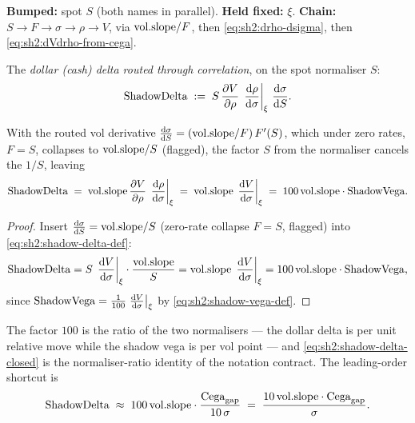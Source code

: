 \textbf{Bumped:} spot $S$ (both names in parallel). \textbf{Held fixed:}
$\xi$. \textbf{Chain:}
$S \to F \to \sigma \to \rho \to V$, via $\mathrm{vol.slope}/F$, then
\eqref{eq:sh2:drho-dsigma}, then \eqref{eq:sh2:dVdrho-from-cega}.

\begin{definition}\label{def:sh2:shadow-delta}
The \emph{dollar (cash) delta routed through correlation}, on the spot
normaliser $S$:
\begin{equation}\label{eq:sh2:shadow-delta-def}
  \mathrm{ShadowDelta}
  \;:=\; S\, \frac{\partial V}{\partial \rho}\,
         \left.\frac{\mathrm{d} \rho}{\mathrm{d} \sigma}\right|_{\xi}\, \frac{\mathrm{d} \sigma}{\mathrm{d} S}.
\end{equation}
\end{definition}

\begin{proposition}
\label{prop:sh2:shadow-delta}
With the routed vol derivative
$\frac{\mathrm{d} \sigma}{\mathrm{d} S} = (\mathrm{vol.slope} / F)\, F'(S)$, which under zero rates,
$F = S$, collapses to $\mathrm{vol.slope} / S$ (flagged), the factor $S$ from the
normaliser cancels the $1/S$, leaving
\begin{equation}\label{eq:sh2:shadow-delta-closed}
  \mathrm{ShadowDelta}
  \;=\; \mathrm{vol.slope}\, \frac{\partial V}{\partial \rho}\, \left.\frac{\mathrm{d} \rho}{\mathrm{d} \sigma}\right|_{\xi}
  \;=\; \mathrm{vol.slope}\, \left.\frac{\mathrm{d} V}{\mathrm{d} \sigma}\right|_{\xi}
  \;=\; 100\, \mathrm{vol.slope} \cdot \mathrm{ShadowVega} .
\end{equation}
\end{proposition}

\begin{proof}
Insert $\frac{\mathrm{d} \sigma}{\mathrm{d} S} = \mathrm{vol.slope} / S$ (zero-rate collapse $F = S$,
flagged) into \eqref{eq:sh2:shadow-delta-def}:
\[
  \mathrm{ShadowDelta}
  = S\, \left.\frac{\mathrm{d} V}{\mathrm{d} \sigma}\right|_{\xi} \cdot \frac{\mathrm{vol.slope}}{S}
  = \mathrm{vol.slope}\, \left.\frac{\mathrm{d} V}{\mathrm{d} \sigma}\right|_{\xi}
  = 100\, \mathrm{vol.slope} \cdot \mathrm{ShadowVega},
\]
since $\mathrm{ShadowVega} = \tfrac1{100} \left.\frac{\mathrm{d} V}{\mathrm{d} \sigma}\right|_{\xi}$ by
\eqref{eq:sh2:shadow-vega-def}.
\end{proof}

The factor $100$ is the ratio of the two normalisers --- the dollar delta
is per unit relative move while the shadow vega is per vol point --- and
\eqref{eq:sh2:shadow-delta-closed} is the normaliser-ratio identity of the
notation contract. The leading-order shortcut is
\begin{equation}\label{eq:sh2:shadow-delta-shortcut}
  \mathrm{ShadowDelta} \;\approx\; 100\, \mathrm{vol.slope} \cdot \frac{\mathrm{Cega}_{\mathrm{gap}}}{10\,\sigma}
           \;=\; \frac{10\, \mathrm{vol.slope} \cdot \mathrm{Cega}_{\mathrm{gap}}}{\sigma}.
\end{equation}

